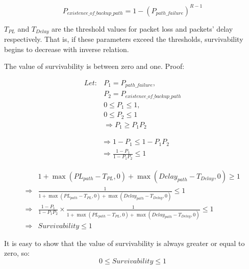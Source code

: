 \documentclass[onecolumn,conference]{IEEEtran}
\begin{document}
    \begin{equation}
        P_{existence\_of\_backup\_path} = 1-\left( P_{path\_failure} \right)^{R-1}
    \end{equation}

    $T_{PL}$ and $T_{Delay}$ are the threshold values for packet loss and packets' delay respectively. That is, if these parameters exceed the thresholds, survivability begins to decrease with inverse relation.

    The value of survivability is between zero and one. Proof:

    \begin{equation}
        \begin{split}
            Let:&P_1=P_{path\_failure},\\
            &P_2=P_{existence\_of\_backup\_path} \\
            &0 \leq P_1 \leq 1, \\
            &0 \leq P_2 \leq 1 \\
            &\Rightarrow P_1 \geq P_1P_2
        \end{split}
    \end{equation}

    \begin{equation}
        \begin{split}
            &\Rightarrow 1-P_1\leq 1-P_1P_2 \\
            &\Rightarrow \frac{1-P_1}{1-P_1P_2}\leq1
        \end{split}
    \end{equation}

    \begin{equation}
        \begin{split}
            & 1+\max\left( PL_{path} -T_{PL},0 \right)+\max\left( Delay_{path}-T_{Delay},0 \right) \geq 1 \\
            \Rightarrow & \frac{1}{1+\max\left( PL_{path} -T_{PL},0 \right)+\max\left( Delay_{path}-T_{Delay},0 \right)} \leq 1 \\
            \Rightarrow & \frac{1-P_1}{1-P_1P_2}\times\frac{1}{1+\max\left( PL_{path} -T_{PL},0 \right)+\max\left( Delay_{path}-T_{Delay},0 \right)}\leq 1 \\
            \Rightarrow & Survivability \leq 1
        \end{split}
    \end{equation}

    It is easy to show that the value of survivability is always greater or equal to zero, so:
    \begin{equation}
        0 \leq Survivability \leq 1
    \end{equation}
\end{document}
